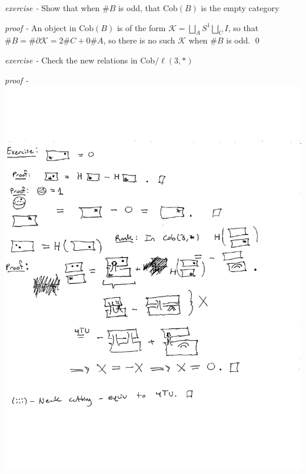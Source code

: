 \documentclass[11pt]{article}
\theoremstyle{definition}
\begin{document}
    \emph{exercise - } Show that when \(\#B\) is odd, that \(\text{Cob}(B)\) is the empty category

    \emph{proof - } An object in \(\text{Cob}(B)\) is of the form \(\mathcal{K} = \bigsqcup_A S^1 \bigsqcup_C I\), so that \(\# B = \# \partial \mathcal{K} = 2 \# C + 0\#A\), so there is no such \(\mathcal{K}\) when \(\# B\) is odd. \qed




    \emph{exercise - } Check the new relations in \(\text{Cob}/\ell(3,*)\)

    \emph{proof - } \includegraphics[width=\linewidth]{additional pdfs/new relations in Cob:l(4).pdf}
\end{document}
